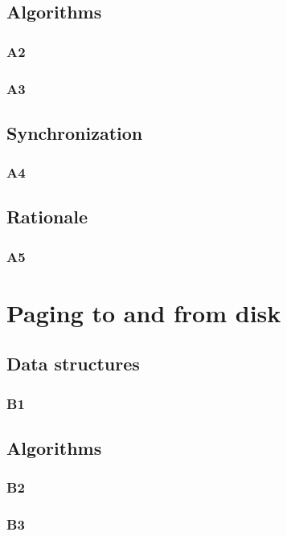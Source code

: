\documentclass[a4wide, 11pt]{article}
\begin{document}
 

\subsection{Algorithms}
\subsubsection{A2}

\subsubsection{A3}

\subsection{Synchronization}
\subsubsection{A4}

\subsection{Rationale}
\subsubsection{A5}

\section{Paging to and from disk}

\subsection{Data structures}
\subsubsection{B1}

\subsection{Algorithms}
\subsubsection{B2}

\subsubsection{B3}
\end{document}
